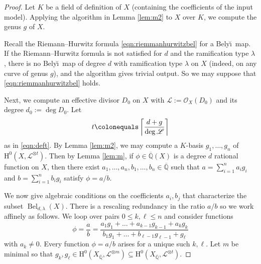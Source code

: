 \documentclass{amsproc}
\numberwithin{equation}{section}
\numberwithin{figure}{section}
\theoremstyle{definition}
\theoremstyle{remark}
\DeclareMathOperator{\ord}{ord}
\newcommand{\Qbar}{\overline{\mathbb{Q}}}
\newcommand{\scrL}{\mathscr{L}}
\newcommand\scrO{\mathscr{O}}
\newcommand\Hzero{\mathrm{H}^0}
\DeclareMathOperator{\Bel}{Bel}
\renewcommand{\leq}{\leqslant}
\newcommand{\Belyi}{Bely\u{\i}}
\newcommand{\aj}[1]{{\color{magenta} \textsf{[[#1]]}}}
\begin{document}
\begin{proof}
Let $K$ be a field of definition of $X$ (containing the coefficients of the input model).  Applying the algorithm in Lemma \ref{lem:m2} to  $X$ over $K$,
we compute the genus $g$ of $X$.

Recall the Riemann--Hurwitz formula \eqref{eqn:riemmanhurwitzbel} for a \Belyi\ map.  If the Riemann--Hurwitz formula is not satisfied for $d$ and the ramification type $\lambda$, there is no \Belyi\ map of degree $d$ with ramification type $\lambda$ on $X$ (indeed, on any curve of genus $g$), and the algorithm gives trivial output.  So we may suppose that \eqref{eqn:riemmanhurwitzbel} holds.

Next, we compute an effective divisor $D_0$ on $X$ with $\scrL := \scrO_X(D_0)$ and its degree $d_0 := \deg D_0$.  Let   
\[ t \colonequals \left\lceil \frac{d+g}{\deg \scrL} \right\rceil \]
as in \eqref{eqn:deft}.  By Lemma \ref{lem:m2}, we may compute a $K$-basis  $g_1, \ldots, g_n$ of $\mathrm{H}^0(X,\scrL^{\otimes t})$.  Then by Lemma \ref{lem:m}, if $\phi \in \Qbar(X)$ is a degree $d$ rational function on $X$, then there exist $a_1,\dots,a_n,b_1,\dots,b_n \in \Qbar$ such that $a =\sum_{i=1}^n a_i g_i$ and $b= \sum_{i=1}^n b_i g_i$ satisfy $\phi=a/b$. 

 We now give algebraic conditions on the coefficients $a_i,b_j$ that characterize the subset $\Bel_{d,\lambda}(X)$.  There is a rescaling redundancy in the ratio $a/b$ so we work affinely as follows.  We loop over pairs $0 \leq k,\ell \leq n$ and consider functions 
\begin{equation} \label{eqn:fa0b0}
\phi = \frac{a}{b}=\frac{a_1g_1 + \dots + a_{k-1} g_{k-1} + a_kg_k}{b_1g_1 + \dots + b_{\ell-1} g_{\ell-1} + g_\ell} 
\end{equation}
with $a_k \neq 0$.  Every function $\phi=a/b$ arises for a unique such $k,\ell$.   
Let $m$ be minimal so that $g_k,g_\ell \in \Hzero(X_{\Qbar},\scrL^{\otimes m}) \subseteq \Hzero(X_{\Qbar},\scrL^{\otimes t})$. 
 

\end{proof}
\end{document}
